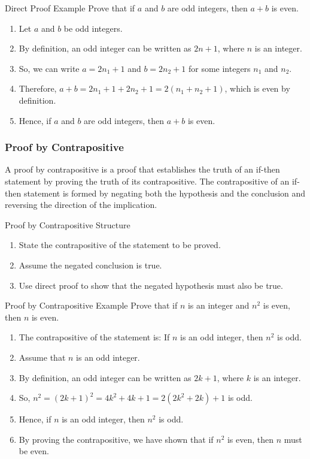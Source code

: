 \documentclass{beamer}
\begin{document}
\begin{frame}{Direct Proof Example}
Prove that if $a$ and $b$ are odd integers, then $a+b$ is even.
\pause 
\begin{enumerate}
    \item<1-> Let $a$ and $b$ be odd integers.
    \pause
    \item<2-> By definition, an odd integer can be written as $2n+1$, where $n$ is an integer.
    \pause
    \item<3-> So, we can write $a=2n_1+1$ and $b=2n_2+1$ for some integers $n_1$ and $n_2$.
    \pause
    \item<4-> Therefore, $a+b=2n_1+1+2n_2+1=2(n_1+n_2+1)$, which is even by definition.
    \pause
    \item<5-> Hence, if $a$ and $b$ are odd integers, then $a+b$ is even.
\end{enumerate}
\end{frame}

\begin{frame}
\frametitle{Proof by Contrapositive}
A proof by contrapositive is a proof that establishes the truth of an if-then statement by proving the truth of its contrapositive. The contrapositive of an if-then statement is formed by negating both the hypothesis and the conclusion and reversing the direction of the implication. 
\end{frame}

\begin{frame}{Proof by Contrapositive Structure}
\begin{enumerate}
    \item<1-> State the contrapositive of the statement to be proved.
    \pause
    \item<2-> Assume the negated conclusion is true.
    \pause
    \item<3-> Use direct proof to show that the negated hypothesis must also be true.
\end{enumerate}
\end{frame}

\begin{frame}{Proof by Contrapositive Example}
Prove that if $n$ is an integer and $n^2$ is even, then $n$ is even.
\pause
\begin{enumerate}
    \item<1-> The contrapositive of the statement is: If $n$ is an odd integer, then $n^2$ is odd.
    \pause
    \item<2-> Assume that $n$ is an odd integer.
    \pause
    \item<3-> By definition, an odd integer can be written as $2k+1$, where $k$ is an integer.
    \pause
    \item<4-> So, $n^2=(2k+1)^2=4k^2+4k+1=2(2k^2+2k)+1$ is odd.
    \pause
    \item<5-> Hence, if $n$ is an odd integer, then $n^2$ is odd.
    \pause
    \item<6-> By proving the contrapositive, we have shown that if $n^2$ is even, then $n$ must be even.
\end{enumerate}
\end{frame}
\end{document}
